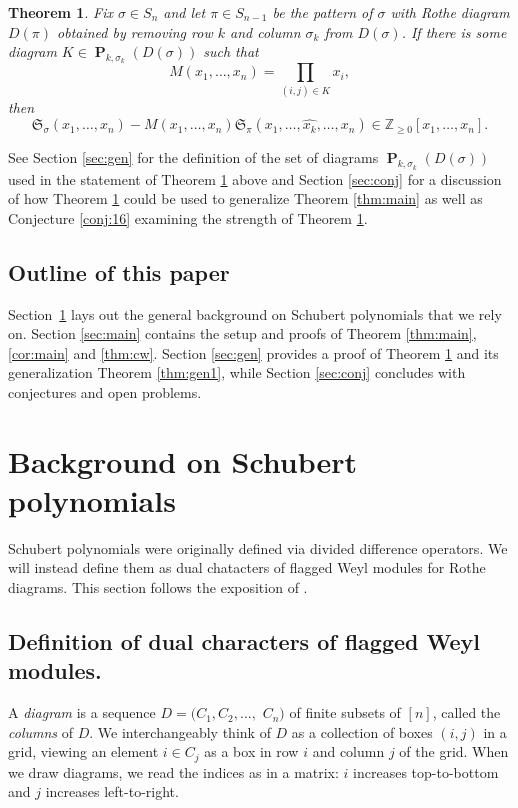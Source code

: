 \documentclass{amsart}
\newtheorem{theorem}{Theorem}[section]
\theoremstyle{definition}
\theoremstyle{named}
\DeclareMathOperator*{\Purple}{\mathbf{P}}
\begin{document}
	\begin{theorem} \label{thm:gen}
	Fix  $\sigma \in S_n$ and let $\pi \in S_{n-1}$ be the pattern of $\sigma$ with Rothe diagram $D(\pi)$ obtained by removing row $k$  and column $\sigma_k$ from $D(\sigma)$. 
If there is some diagram $K \in \Purple_{k, \sigma_k}(D(\sigma))$ such that
\[
M(x_1, \dots, x_n) = \prod_{(i, j) \in K} x_i,
\]
then
 \[
\mathfrak{S}_{\sigma}(x_1, \ldots, x_n)-M(x_1, \ldots, x_n) \mathfrak{S}_{\pi}(x_{1}, \ldots, \widehat{x_k}, \ldots, x_{n}) \in \mathbb{Z}_{\geq 0}[x_1, \ldots, x_n].\]\end{theorem}

 See Section \ref{sec:gen} for the definition of the set of diagrams $\Purple_{k, \sigma_k}(D(\sigma))$ used in the statement of Theorem \ref{thm:gen} above and Section \ref{sec:conj} for a discussion of how  Theorem \ref{thm:gen} could be used to generalize Theorem \ref{thm:main} as well as Conjecture \ref{conj:16} examining the strength of  Theorem \ref{thm:gen}. 

	\subsection*{Outline of this paper}
	Section~\ref{sec:background}  lays out the general background on Schubert polynomials that we rely on. Section \ref{sec:main} contains the setup and proofs of Theorem \ref{thm:main}, \ref{cor:main} and  \ref{thm:cw}.  Section \ref{sec:gen} provides a proof of Theorem \ref{thm:gen} and its generalization Theorem \ref{thm:gen1}, while Section \ref{sec:conj} concludes with conjectures and open problems.

	\section{Background on Schubert polynomials}
	\label{sec:background}

	Schubert polynomials were originally defined via divided difference operators. We will instead define them as dual chatacters of flagged Weyl modules for Rothe diagrams. This section follows the exposition of \cite{FMS, zeroone}. 

	\subsection{Definition of dual characters of flagged Weyl modules.}
	A \emph{diagram} is a sequence $D = (C_1, C_2, \ldots,$ $C_n)$ of finite subsets of $[n]$, called the \emph{columns} of $D$. We interchangeably think of $D$ as a collection of boxes $(i,j)$ in a grid, viewing an element $i\in C_j$ as a box in row $i$ and column $j$ of the grid. When we draw diagrams, we read the indices as in a matrix: $i$ increases top-to-bottom and $j$ increases left-to-right. 
\end{document}
